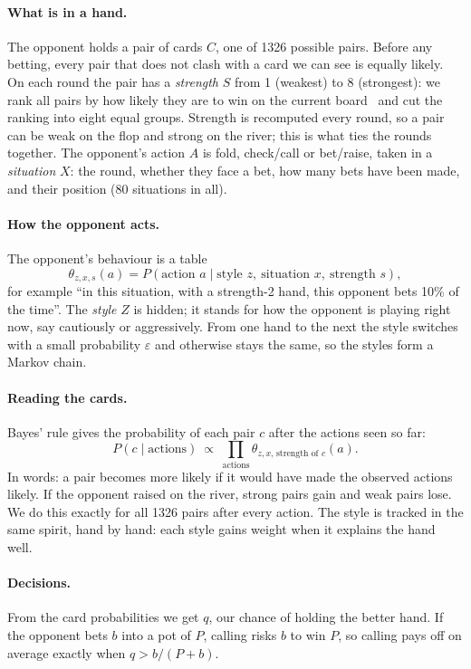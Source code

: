 \documentclass[11pt,a4paper]{article}
\begin{document}
\paragraph{What is in a hand.} The opponent holds a pair of cards $C$, one of
1326 possible pairs. Before any betting, every pair that does not clash with a
card we can see is equally likely. On each round the pair has a
\emph{strength} $S$ from 1 (weakest) to 8 (strongest): we rank all pairs by
how likely they are to win on the current board~\cite{johanson2013} and cut the
ranking into eight equal groups. Strength is recomputed every round, so a pair
can be weak on the flop and strong on the river; this is what ties the rounds
together. The opponent's action $A$ is fold, check/call or bet/raise, taken in
a \emph{situation} $X$: the round, whether they face a bet, how many bets have
been made, and their position (80 situations in all).

\paragraph{How the opponent acts.} The opponent's behaviour is a table
\[
  \theta_{z,x,s}(a)=P(\text{action }a\mid\text{style }z,\ \text{situation }x,\
  \text{strength }s),
\]
for example ``in this situation, with a strength-2 hand, this opponent bets
10\% of the time''. The \emph{style} $Z$ is hidden; it stands for how the
opponent is playing right now, say cautiously or aggressively. From one hand to
the next the style switches with a small probability $\varepsilon$ and
otherwise stays the same, so the styles form a Markov chain.

\paragraph{Reading the cards.} Bayes' rule gives the probability of each pair
$c$ after the actions seen so far:
\[
  P(c\mid\text{actions})\ \propto\
  \prod_{\text{actions}}\theta_{z,x,\,\text{strength of }c}(a).
\]
In words: a pair becomes more likely if it would have made the observed
actions likely. If the opponent raised on the river, strong pairs gain and weak
pairs lose. We do this exactly for all 1326 pairs after every action. The style
is tracked in the same spirit, hand by hand: each style gains weight when it
explains the hand well.

\paragraph{Decisions.} From the card probabilities we get $q$, our chance of
holding the better hand. If the opponent bets $b$ into a pot of $P$, calling
risks $b$ to win $P$, so calling pays off on average exactly when
$q>b/(P+b)$.
\end{document}
